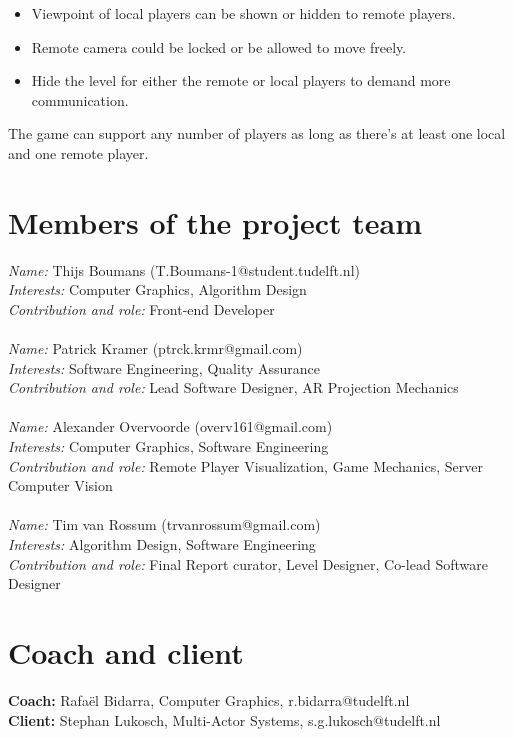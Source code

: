\begin{itemize}
    \item Viewpoint of local players can be shown or hidden to remote players.
    \item Remote camera could be locked or be allowed to move freely.
    \item Hide the level for either the remote or local players to demand more
    communication.
\end{itemize}
The game can support any number of players as long as there's at least one local
and one remote player.

\section*{Members of the project team}
\textit{Name:} Thijs Boumans (T.Boumans-1@student.tudelft.nl)\\
\textit{Interests:} Computer Graphics, Algorithm Design \\
\textit{Contribution and role:} Front-end Developer \\
\\
\textit{Name:} Patrick Kramer (ptrck.krmr@gmail.com) \\
\textit{Interests:} Software Engineering, Quality Assurance \\
\textit{Contribution and role:} Lead Software Designer, AR Projection Mechanics \\
\\
\textit{Name:} Alexander Overvoorde (overv161@gmail.com)\\
\textit{Interests:} Computer Graphics, Software Engineering\\
\textit{Contribution and role:} Remote Player Visualization, Game Mechanics, Server Computer Vision\\
\\
\textit{Name:} Tim van Rossum (trvanrossum@gmail.com)\\
\textit{Interests:} Algorithm Design, Software Engineering \\
\textit{Contribution and role:} Final Report curator, Level Designer, Co-lead Software Designer 

\section*{Coach and client}
\textbf{Coach:} Rafa\"el Bidarra, Computer Graphics, r.bidarra@tudelft.nl\\
\textbf{Client:} Stephan Lukosch, Multi-Actor Systems, s.g.lukosch@tudelft.nl